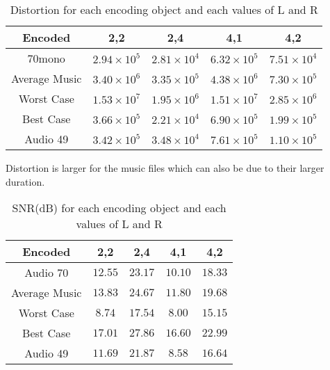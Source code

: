 \documentclass[a4paper, 11pt]{article}
\begin{document}
			\begin{table}[H]
				\centering
				\begin{tabular}{c|c|c|c|c}
					\textbf{Encoded} & \textbf{2,2} 			& \textbf{2,4}		&  \textbf{4,1}				& \textbf{4,2} \\ \hline
					70mono			& $ 2.94 \times 10^{5} $ 	& $ 2.81 \times 10^{4} $& $ 6.32 \times 10^{5} $ 	& $ 7.51 \times 10^{4} $ \\ \hline
					Average Music	& $ 3.40 \times 10^{6} $ 	& $ 3.35 \times 10^{5} $& $ 4.38 \times 10^{6} $  	& $ 7.30 \times 10^{5} $ \\ \hline	
					Worst Case 		& $ 1.53 \times 10^{7} $	& $	1.95 \times 10^{6} $& $ 1.51 \times 10^{7} $	& $ 2.85 \times 10^6 $ \\ \hline
					Best Case 		& $ 3.66 \times 10^{5} $	& $ 2.21 \times 10^{4} $& $ 6.90 \times 10^{5} $ 	& $	1.99 \times 10^5 $ \\ \hline
					Audio 49		& $ 3.42 \times 10^{5} $	& $ 3.48 \times 10^{4} $& $ 7.61 \times 10^{5} $ 	& $ 1.10 \times 10^{5} $	\\
				\end{tabular}
				\caption{Distortion for each encoding object and each values of L and R}
				\label{table:EncodeDist}
			\end{table}		
			Distortion is larger for the music files which can also be due to their larger duration.		
			
			\begin{table}[H]
				\centering
				\begin{tabular}{c|c|c|c|c}
					\textbf{Encoded} 	& \textbf{2,2} 	& \textbf{2,4}	& \textbf{4,1}	& \textbf{4,2} \\ \hline
					Audio 70			& $ 12.55 $ 	& $  23.17 $	& $ 10.10 $		& $ 18.33 $ 	\\ \hline
					Average Music		& $ 13.83 $ 	& $  24.67  $	& $ 11.80 $  	& $ 19.68 $ 	\\ \hline	
					Worst Case 			& $ 8.74 $		& $	 17.54 $	& $ 8.00 $		& $ 15.15  $ 	\\ \hline
					Best Case 			& $ 17.01 $		& $ 27.86 $		& $ 16.60 $ 	& $	22.99  $ 	\\ \hline
					Audio 49 			& $ 11.69 $		& $ 21.87  $	& $ 8.58 $ 		& $	16.64  $ 	\\
				\end{tabular}
				\caption{SNR(dB) for each encoding object and each values of L and R}
				\label{table:EncodeSNR}
			\end{table}
		
\end{document}
